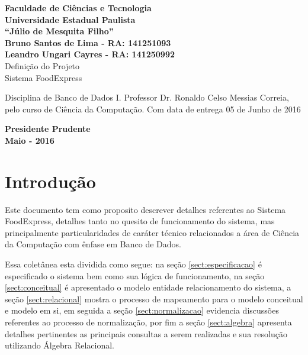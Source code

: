 \documentclass[12pt, onecolumn, titlepage]{article}
\begin{document}

\begin{titlepage} %
	
	\vfill
	\begin{center}
	
		{\large \textbf{Faculdade de Ciências e Tecnologia\\Universidade Estadual Paulista\\``Júlio de Mesquita Filho''}} \\[3cm]
		{\small \textbf{Bruno Santos de Lima - RA: 141251093}}\\
		{\small \textbf{Leandro Ungari Cayres - RA: 141250992}}\\[3cm]
		{\Large Definição do Projeto}\\
		{\Large Sistema FoodExpress}\\[3cm]

	\hspace{.45\textwidth} %
	\begin{minipage}{.5\textwidth}
		\small Disciplina de Banco de Dados I. Professor Dr. Ronaldo Celso Messias Correia, pelo curso de Ciência da Computação. Com data de entrega 05 de Junho de 2016 \\[0.5cm]
	\end{minipage}

	\vfill
	\vspace{1.5cm}
	
	\large \textbf{Presidente Prudente\\}
	\large \textbf{Maio - 2016}
	
	\end{center}
	
\end{titlepage}
\newpage

\renewcommand{\contentsname}{Índice}
\tableofcontents

\newpage

\section{Introdução}
\label{sect:introducao}

Este documento tem como proposito descrever detalhes referentes ao Sistema FoodExpress, detalhes tanto no quesito de funcionamento do sistema, mas principalmente particularidades de caráter técnico relacionados a área de Ciência da Computação com ênfase em Banco de Dados. 

Essa coletânea esta dividida como segue: na seção \ref{sect:especificacao} é especificado o sistema bem como sua lógica de funcionamento, na seção \ref{sect:conceitual} é apresentado o modelo entidade relacionamento do sistema, a seção \ref{sect:relacional} mostra o processo de mapeamento para o modelo conceitual e modelo em si, em seguida a seção \ref{sect:normalizacao} evidencia discussões referentes ao processo de normalização, por fim a seção \ref{sect:algebra} apresenta detalhes pertinentes as principais consultas a serem realizadas e sua resolução utilizando Álgebra Relacional.
\end{document}
